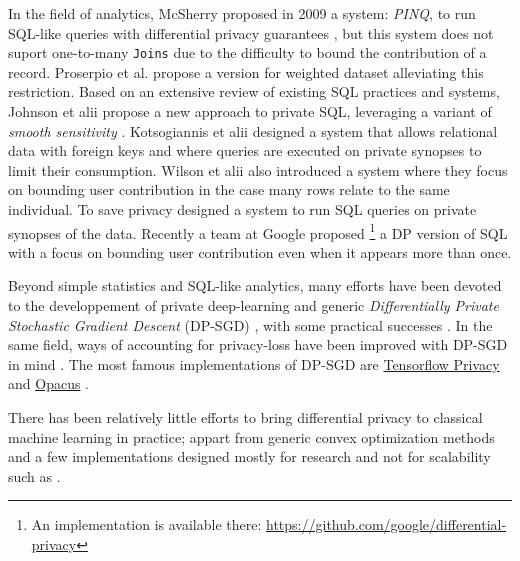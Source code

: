 \documentclass{article}
\theoremstyle{definition}
\begin{document}
In the field of analytics, McSherry proposed in 2009 a system: \emph{PINQ}, to run SQL-like queries
with differential privacy guarantees \cite{mcsherry2009privacy}, but this system does not suport
one-to-many \verb"Joins" due to the difficulty to bound the contribution of a record.
Proserpio et al. \cite{proserpio2012calibrating} propose a version for weighted dataset alleviating
this restriction.
Based on an extensive review of existing SQL practices and systems, Johnson et alii \cite{johnson2018towards}
propose a new approach to private SQL, leveraging a variant of \emph{smooth sensitivity} \cite{nissim2007smooth}.
Kotsogiannis et alii \cite{kotsogiannis2019privatesql, kotsogiannis2019architecting} designed a system that allows
relational data with foreign keys and where queries are executed on private synopses to limit their consumption.
Wilson et alii also introduced a system \cite{wilson2019differentially} where they focus on bounding user contribution
in the case many rows relate to the same individual.
To save privacy \cite{kotsogiannis2019privatesql, kotsogiannis2019architecting} designed a system to run SQL queries
on private synopses of the data.
Recently a team at Google proposed \footnote{An implementation is available there: \href{https://github.com/google/differential-privacy}{https://github.com/google/differential-privacy}}
a DP version of SQL \cite{wilson2019differentially} with a focus on bounding user contribution even when it appears more than once.

Beyond simple statistics and SQL-like analytics, many efforts have been devoted to the developpement of
private deep-learning and generic \emph{Differentially Private Stochastic Gradient Descent} (DP-SGD)
\cite{abadi2016deep, papernot2018scalable, kairouz2021practical}, with some practical successes \cite{mcmahan2017learning}.
In the same field, ways of accounting for privacy-loss have been improved with DP-SGD in mind \cite{mironov2017renyi, bu2020deep}.
The most famous implementations of DP-SGD are \href{https://github.com/tensorflow/privacy}{Tensorflow Privacy} \cite{mcmahan2018general}
and \href{https://github.com/pytorch/opacus}{Opacus} \cite{opacus}.

There has been relatively little efforts to bring differential privacy to classical machine learning in practice;
appart from generic convex optimization methods \cite{wu2017bolt, iyengar2019towards} and a few implementations
designed mostly for research and not for scalability such as \cite{diffprivlib}.
\end{document}
